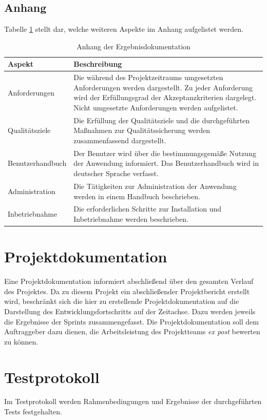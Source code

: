 \documentclass[a4paper,11pt,listof=numbered,glossary=totoc,parskip=half,toc=bib]{scrreprt}
\begin{document}
	\subsection{Anhang}
	Tabelle \ref{tab:ergebnisdokumentation_anhang} stellt dar, welche weiteren Aspekte im Anhang aufgelistet werden.
	\begin{table}
		\centering
		\begin{tabularx}{\textwidth}{lX}
			\toprule
			\textbf{Aspekt} & \textbf{Beschreibung} \\
			\midrule
			Anforderungen & Die während des Projektzeitraums umgesetzten Anforderungen werden dargestellt. Zu jeder Anforderung wird der Erfüllungsgrad der Akzeptanzkriterien dargelegt. Nicht umgesetzte Anforderungen werden aufgelistet. \\
			Qualitätsziele & Die Erfüllung der Qualitätsziele und die durchgeführten Maßnahmen zur Qualitätssicherung werden zusammenfassend dargestellt. \\
			Benutzerhandbuch & Der Benutzer wird über die bestimmungsgemäße Nutzung der Anwendung informiert. Das Benutzerhandbuch wird in deutscher Sprache verfasst. \\
			Administration & Die Tätigkeiten zur Administration der Anwendung werden in einem Handbuch beschrieben. \\
			Inbetriebnahme & Die erforderlichen Schritte zur Installation und Inbetriebnahme werden beschrieben. \\
			\bottomrule
		\end{tabularx}
		\caption{Anhang der Ergebnisdokumentation}
		\label{tab:ergebnisdokumentation_anhang}
	\end{table}
	
	\section{Projektdokumentation}
	Eine Projektdokumentation informiert abschließend über den gesamten Verlauf des Projektes. Da zu diesem Projekt ein abschließender Projektbericht erstellt wird, beschränkt sich die hier zu erstellende Projektdokumentation auf die Darstellung des Entwicklungsfortschritts auf der Zeitachse. Dazu werden jeweils die Ergebnisse der Sprints zusammengefasst. Die Projektdokumentation soll dem Auftraggeber dazu dienen, die Arbeitsleistung des Projektteams \textit{ex post} bewerten zu können.
	 
	\section{Testprotokoll}
	\label{sec:testproto}
	Im Testprotokoll werden Rahmenbedingungen und Ergebnisse der durchgeführten Tests festgehalten.
	
\end{document}

